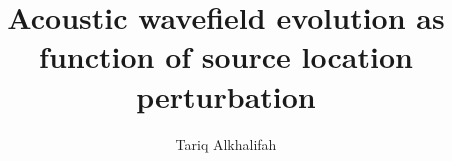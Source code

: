 \def\bea{\begin{eqnarray}}
\def\eea{  \end{eqnarray}}

\def\beq{\begin{equation}}
\def\eeq{\end{equation}}
\def\beqa{\begin{eqnarray}}
\def\eeqa{\end{eqnarray}}

\title{Acoustic wavefield evolution as function of source location perturbation}




\author{Tariq Alkhalifah}

\maketitle

